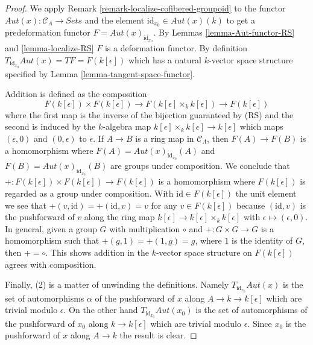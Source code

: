 \documentclass[10pt,a4paper]{amsart}
\theoremstyle{plain}
\theoremstyle{definition}
\theoremstyle{remark}
\numberwithin{equation}{subsection}
\begin{document}
\begin{proof}
We apply
Remark \ref{remark-localize-cofibered-groupoid}
to the functor $\mathit{Aut}(x) : \mathcal{C}_A \to \textit{Sets}$
and the element $\text{id}_{x_0} \in \mathit{Aut}(x)(k)$ to get
a predeformation functor $F = \mathit{Aut}(x)_{\text{id}_{x_0}}$. By
Lemmas \ref{lemma-Aut-functor-RS} and \ref{lemma-localize-RS}
$F$ is a deformation functor. By definition
$T_{\text{id}_{x_0}} \mathit{Aut}(x) = TF = F(k[\epsilon])$
which has a natural
$k$-vector space structure specified by Lemma
\ref{lemma-tangent-space-functor}.

\medskip\noindent
Addition is defined as the composition
$$
F(k[\epsilon]) \times F(k[\epsilon]) \longrightarrow
F(k[\epsilon] \times_k k[\epsilon]) \longrightarrow
F(k[\epsilon])
$$
where the first map is the inverse of the bijection guaranteed by (RS) and the
second is induced by the $k$-algebra map
$k[\epsilon] \times_k k[\epsilon] \to k[\epsilon]$
which maps $(\epsilon, 0)$ and $(0, \epsilon)$ to $\epsilon$.
If $A \to B$ is a ring map in $\mathcal{C}_\Lambda$, then $F(A) \to F(B)$
is a homomorphism where $F(A) = \mathit{Aut}(x)_{\text{id}_{x_0}}(A)$ and
$F(B) = \mathit{Aut}(x)_{\text{id}_{x_0}}(B)$ are groups under
composition. We conclude that
$+ : F(k[\epsilon]) \times F(k[\epsilon])\to F(k[\epsilon])$
is a homomorphism where $F(k[\epsilon])$ is regarded as a
group under composition. With $\text{id} \in F(k[\epsilon])$ the
unit element we see that $+(v, \text{id}) =
+(\text{id}, v) = v$ for any $v \in F(k[\epsilon])$ because
$(\text{id}, v)$ is the pushforward of $v$ along the ring map
$k[\epsilon] \to k[\epsilon] \times_k k[\epsilon]$ with
$\epsilon \mapsto (\epsilon, 0)$.
In general, given a group $G$ with multiplication $\circ$
and $+ : G \times G \to G$ is a homomorphism such that
$+(g, 1) = +(1, g) = g$, where $1$ is the identity of $G$, then $+ = \circ$.
This shows addition in the $k$-vector space structure on $F(k[\epsilon])$
agrees with composition.

\medskip\noindent
Finally, (2) is a matter of unwinding the definitions. Namely
$T_{\text{id}_{x_0}} \mathit{Aut}(x)$ is the set of
automorphisms $\alpha$ of the pushforward of $x$ along
$A \to k \to k[\epsilon]$ which are trivial modulo $\epsilon$.
On the other hand $T_{\text{id}_{x_0}} \mathit{Aut}(x_0)$ is the set of
automorphisms of the pushforward of $x_0$ along
$k \to k[\epsilon]$ which are trivial modulo $\epsilon$.
Since $x_0$ is the pushforward of $x$ along $A \to k$ the result
is clear.
\end{proof}
\end{document}
